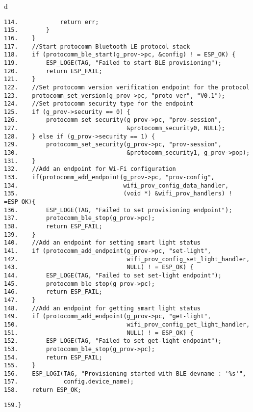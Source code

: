 \documentclass[a4paper,12pt]{book}
\begin{document}
\begin{codebloc}
\begin{tabular}{d}
\vspace{2pt}
\begin{verbatim}
114.            return err;
115.        }
116.    }
117.    //Start protocomm Bluetooth LE protocol stack
118.    if (protocomm_ble_start(g_prov->pc, &config) ! = ESP_OK) {
119.        ESP_LOGE(TAG, "Failed to start BLE provisioning");
120.        return ESP_FAIL;
121.    }
122.    //Set protocomm version verification endpoint for the protocol
123.    protocomm_set_version(g_prov->pc, "proto-ver", "V0.1");
124.    //Set protocomm security type for the endpoint
125.    if (g_prov->security == 0) {
126.        protocomm_set_security(g_prov->pc, "prov-session",
127.                               &protocomm_security0, NULL);
128.    } else if (g_prov->security == 1) {
129.        protocomm_set_security(g_prov->pc, "prov-session",
130.                               &protocomm_security1, g_prov->pop);
131.    }
132.    //Add an endpoint for Wi-Fi configuration
133.    if(protocomm_add_endpoint(g_prov->pc, "prov-config",
134.                              wifi_prov_config_data_handler,
135.                              (void *) &wifi_prov_handlers) ! =ESP_OK){
136.        ESP_LOGE(TAG, "Failed to set provisioning endpoint");
137.        protocomm_ble_stop(g_prov->pc);
138.        return ESP_FAIL;
139.    }
140.    //Add an endpoint for setting smart light status
141.    if (protocomm_add_endpoint(g_prov->pc, "set-light",
142.                               wifi_prov_config_set_light_handler,
143.                               NULL) ! = ESP_OK) {
144.        ESP_LOGE(TAG, "Failed to set set-light endpoint");
145.        protocomm_ble_stop(g_prov->pc);
146.        return ESP_FAIL;
147.    }
148.    //Add an endpoint for getting smart light status
149.    if (protocomm_add_endpoint(g_prov->pc, "get-light",
150.                               wifi_prov_config_get_light_handler,
151.                               NULL) ! = ESP_OK) {
152.        ESP_LOGE(TAG, "Failed to set get-light endpoint");
153.        protocomm_ble_stop(g_prov->pc);
154.        return ESP_FAIL;
155.    }
156.    ESP_LOGI(TAG, "Provisioning started with BLE devname : '%s'",
157.             config.device_name);
158.    return ESP_OK;
\end{verbatim}
\verb|159.}|
\end{tabular}
\end{codebloc}
\end{document}
